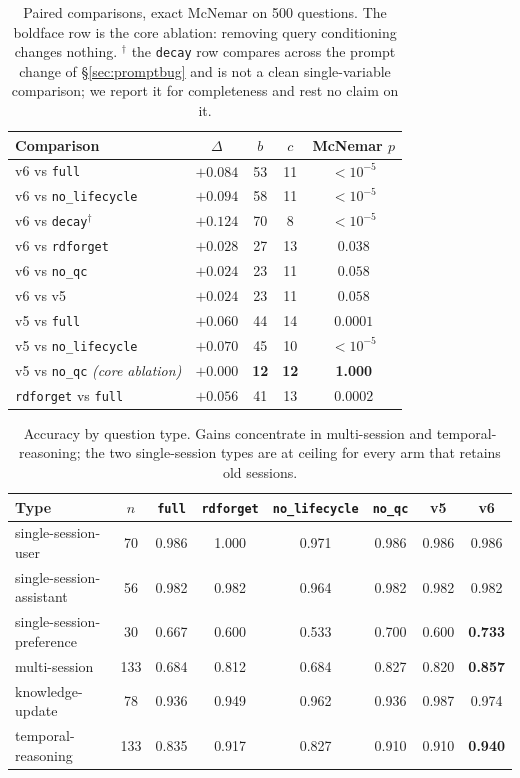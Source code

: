 \documentclass[11pt]{article}
\newcommand{\arm}[1]{\texttt{#1}}
\begin{document}
\begin{table}[ht]
\centering
\small
\begin{tabular}{@{}lcccc@{}}
\toprule
\textbf{Comparison} & $\Delta$ & $b$ & $c$ & \textbf{McNemar $p$} \\
\midrule
v6 vs \arm{full}                  & $+0.084$ & 53 & 11 & $< 10^{-5}$ \\
v6 vs \arm{no\_lifecycle}         & $+0.094$ & 58 & 11 & $< 10^{-5}$ \\
v6 vs \arm{decay}$^{\dagger}$     & $+0.124$ & 70 & 8  & $< 10^{-5}$ \\
v6 vs \arm{rdforget}              & $+0.028$ & 27 & 13 & $0.038$ \\
v6 vs \arm{no\_qc}                & $+0.024$ & 23 & 11 & $0.058$ \\
v6 vs v5                          & $+0.024$ & 23 & 11 & $0.058$ \\
v5 vs \arm{full}                  & $+0.060$ & 44 & 14 & $0.0001$ \\
v5 vs \arm{no\_lifecycle}         & $+0.070$ & 45 & 10 & $< 10^{-5}$ \\
v5 vs \arm{no\_qc} \emph{(core ablation)} & $\mathbf{+0.000}$ & \textbf{12} & \textbf{12} & \textbf{1.000} \\
\arm{rdforget} vs \arm{full}      & $+0.056$ & 41 & 13 & $0.0002$ \\
\bottomrule
\end{tabular}
\caption{Paired comparisons, exact McNemar on 500 questions. The boldface row is the core ablation: removing query conditioning changes nothing. $^{\dagger}$ the \arm{decay} row compares across the prompt change of \S\ref{sec:promptbug} and is not a clean single-variable comparison; we report it for completeness and rest no claim on it.}
\end{table}

\begin{table}[ht]
\centering
\small
\begin{tabular}{@{}lccccccc@{}}
\toprule
\textbf{Type} & $n$ & \arm{full} & \arm{rdforget} & \arm{no\_lifecycle} & \arm{no\_qc} & v5 & \textbf{v6} \\
\midrule
single-session-user       & 70  & 0.986 & 1.000 & 0.971 & 0.986 & 0.986 & 0.986 \\
single-session-assistant  & 56  & 0.982 & 0.982 & 0.964 & 0.982 & 0.982 & 0.982 \\
single-session-preference & 30  & 0.667 & 0.600 & 0.533 & 0.700 & 0.600 & \textbf{0.733} \\
multi-session             & 133 & 0.684 & 0.812 & 0.684 & 0.827 & 0.820 & \textbf{0.857} \\
knowledge-update          & 78  & 0.936 & 0.949 & 0.962 & 0.936 & 0.987 & 0.974 \\
temporal-reasoning        & 133 & 0.835 & 0.917 & 0.827 & 0.910 & 0.910 & \textbf{0.940} \\
\bottomrule
\end{tabular}
\caption{Accuracy by question type. Gains concentrate in multi-session and temporal-reasoning; the two single-session types are at ceiling for every arm that retains old sessions.}
\end{table}
\end{document}
